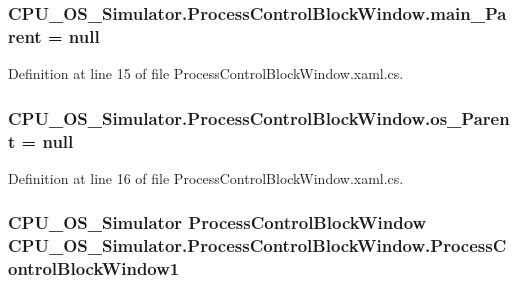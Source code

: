 \subsubsection[{main\+\_\+\+Parent}]{ C\+P\+U\+\_\+\+O\+S\+\_\+\+Simulator.\+Process\+Control\+Block\+Window.\+main\+\_\+\+Parent = {\bf null}\hspace{0.3cm}{\ttfamily [private]}}\label{class_c_p_u___o_s___simulator_1_1_process_control_block_window_a928d5159874200e6ca0fad00913d65e5}


Definition at line 15 of file Process\+Control\+Block\+Window.\+xaml.\+cs.

\hypertarget{class_c_p_u___o_s___simulator_1_1_process_control_block_window_acc4b72c5370a2bcda85b16e0801ce3d9}{}
\subsubsection[{os\+\_\+\+Parent}]{ C\+P\+U\+\_\+\+O\+S\+\_\+\+Simulator.\+Process\+Control\+Block\+Window.\+os\+\_\+\+Parent = {\bf null}\hspace{0.3cm}{\ttfamily [private]}}\label{class_c_p_u___o_s___simulator_1_1_process_control_block_window_acc4b72c5370a2bcda85b16e0801ce3d9}


Definition at line 16 of file Process\+Control\+Block\+Window.\+xaml.\+cs.

\hypertarget{class_c_p_u___o_s___simulator_1_1_process_control_block_window_a0f63765fb81d298b85ac605be61d06ca}{}
\subsubsection[{Process\+Control\+Block\+Window1}]{\setlength{\rightskip}{0pt plus 5cm}C\+P\+U\+\_\+\+O\+S\+\_\+\+Simulator {\bf Process\+Control\+Block\+Window} C\+P\+U\+\_\+\+O\+S\+\_\+\+Simulator.\+Process\+Control\+Block\+Window.\+Process\+Control\+Block\+Window1\hspace{0.3cm}{\ttfamily [package]}}\label{class_c_p_u___o_s___simulator_1_1_process_control_block_window_a0f63765fb81d298b85ac605be61d06ca}


